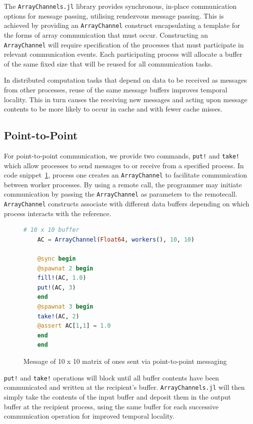 \documentclass{juliacon}
\begin{document}
The \texttt{ArrayChannels.jl} library provides synchronous, in-place
communication options for message passing, utilising rendezvous message
passing. This is achieved by providing an \texttt{ArrayChannel}
construct encapsulating a template for the forms of array communication
that must occur. Constructing an \texttt{ArrayChannel} will require
specification of the processes that must participate in relevant
communication events. Each participating process will allocate a buffer
of the same fixed size that will be reused for all communication tasks.

In distributed computation tasks that depend on data to be received as
messages from other processes, reuse of the same message buffers
improves temporal locality. This in turn causes the receiving new
messages and acting upon message contents to be more likely to occur in
cache and with fewer cache misses.

\subsection{Point-to-Point}
\label{sec:p2p}

For point-to-point communication, we provide two commands, \texttt{put!}
and \texttt{take!} which allow processes to send messages to or receive
from a specified process. In code snippet~\ref{code:put-take}, process
one creates an \texttt{ArrayChannel} to facilitate communication between
worker processes. By using a remote call, the programmer may initiate
communication by passing the \texttt{ArrayChannel} as parameters to the
remotecall. \texttt{ArrayChannel} constructs associate with different
data buffers depending on which process interacts with the reference.

\begin{figure}[htb]
	\begin{lstlisting}[language=Julia]
	# 10 x 10 buffer
	AC = ArrayChannel(Float64, workers(), 10, 10)
	
	@sync begin
	@spawnat 2 begin
	fill!(AC, 1.0)
	put!(AC, 3)
	end
	@spawnat 3 begin
	take!(AC, 2)
	@assert AC[1,1] = 1.0
	end
	end
	\end{lstlisting}
	\caption{Message of 10 x 10 matrix of ones sent via point-to-point messaging}
	\label{code:put-take}
\end{figure}

\texttt{put!} and \texttt{take!} operations will block until all buffer
contents have been communicated and written at the recipient's buffer.
\texttt{ArrayChannels.jl} will then
simply take the contents of the input buffer and deposit them in the
output buffer at the recipient process, using the same buffer for each
successive communication operation for improved temporal locality. 
\end{document}
